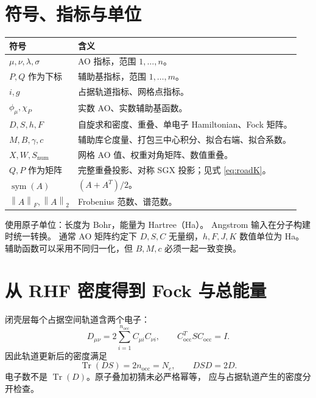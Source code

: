 \documentclass[UTF8,fontset=fandol,11pt,a4paper]{ctexart}
\numberwithin{equation}{section}
\newcommand{\Tr}{\operatorname{Tr}}
\newcommand{\sym}{\operatorname{sym}}
\newcommand{\norm}[1]{\left\lVert #1\right\rVert}
\begin{document}
\section{符号、指标与单位}
\begin{longtable}{p{}p{}}
\toprule 符号&含义\\\midrule\endhead
\(\mu,\nu,\lambda,\sigma\)&AO 指标，范围 \(1,\ldots,n\)。\\
\(P,Q\) 作为下标&辅助基指标，范围 \(1,\ldots,m\)。\\
\(i,g\)&占据轨道指标、网格点指标。\\
\(\phi_\mu,\chi_P\)&实数 AO、实数辅助基函数。\\
\(D,S,h,F\)&自旋求和密度、重叠、单电子 Hamiltonian、Fock 矩阵。\\
\(M,B,\gamma,c\)&辅助库仑度量、打包三中心积分、拟合右端、拟合系数。\\
\(X,W,S_{\mathrm{num}}\)&网格 AO 值、权重对角矩阵、数值重叠。\\
\(Q,P\) 作为矩阵&完整重叠投影、对称 SGX 投影；见式 \eqref{eq:roadK}。\\
\(\sym(A)\)&\((A+A^T)/2\)。\\
\(\norm{A}_F,\norm{A}_2\)&Frobenius 范数、谱范数。\\
\bottomrule
\end{longtable}
使用原子单位：长度为 Bohr，能量为 Hartree（Ha）。
Angstrom 输入在分子构建时统一转换。
通常 AO 矩阵约定下 \(D,S,C\) 无量纲，\(h,F,J,K\) 数值单位为 Ha。
辅助函数可以采用不同归一化，但 \(B,M,c\) 必须一起一致变换。

\section{从 RHF 密度得到 Fock 与总能量}
闭壳层每个占据空间轨道含两个电子：
\begin{equation}
D_{\mu\nu}=2\sum_{i=1}^{n_{\mathrm{occ}}}C_{\mu i}C_{\nu i},
\qquad C_{\mathrm{occ}}^TSC_{\mathrm{occ}}=I.
\end{equation}
因此轨道更新后的密度满足
\begin{equation}
\Tr(DS)=2n_{\mathrm{occ}}=N_e,\qquad DSD=2D.
\label{eq:count}
\end{equation}
电子数不是 \(\Tr(D)\)。原子叠加初猜未必严格幂等，
应与占据轨道产生的密度分开检查。
\end{document}

